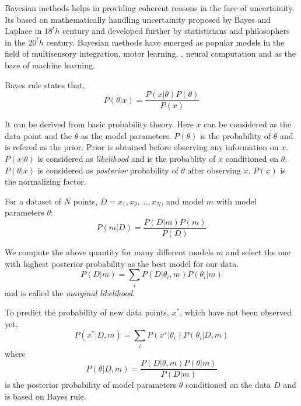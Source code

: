 % 
% 
% 

Bayesian methods helps in providing coherent reasons in the face of uncertainity. Its based 
on mathematically handling uncertainity proposed by Bayes and Laplace in $18^th$ century and 
developed further by statisticians and philosophers in the $20^th$ century. Bayesian methods
have emerged as popular models in the field of multisensory integration, motor learning, 
, neural computation and as the base of machine learning. 

Bayes rule states that,
\begin{equation}
P(\theta | x) = \frac{P(x|\theta) P(\theta)}{P(x)}
\end{equation}

It can be derived from basic probability theory. Here $x$ can be considered as the data point 
and the $\theta$ as the model parameters. $P(\theta)$ is the probability of $\theta$ and is 
refered as the prior. Prior is obtained before observing any information on $x$. $P(x|\theta)$ is
considered as \textit{likelihood} and is the probablity of $x$ conditioned on $\theta$. $P(\theta|x)$
is considered as \textit{posterior} probability of $\theta$ after observing $x$. $P(x)$ is the
normalizing factor.

For a dataset of $N$ points, $D = {x_1, x_2, . . . , x_N}$, and model $m$ with model parameters 
$\theta$:
\begin{equation}
    P(m|D) = \frac{P(D|m) P(m)}{P(D)}
\end{equation}

We compute the above quantity for many different models $m$ and select the one with highest 
posterior probability as the best model for our data. 
\begin{equation}
    P(D|m) = \sum_i{P(D|\theta_i, m)P(\theta_i|m)}
\end{equation}
and is called the \textit{marginal likelihood}.

To predict the probability of new data points, $x^*$, which have not been observed yet,
\begin{equation}
    P(x^*|D, m) = \sum_i{ P(x^∗|\theta_i)P(\theta_i|D, m)}
\end{equation}
where
\begin{equation}
    P(\theta|D,m) = \frac{P(D|\theta, m)P(\theta|m)}{P(D|m)}
\end{equation}
is the posterior probability of model parameters $\theta$ conditioned on the data $D$ and is
based on Bayes rule.
